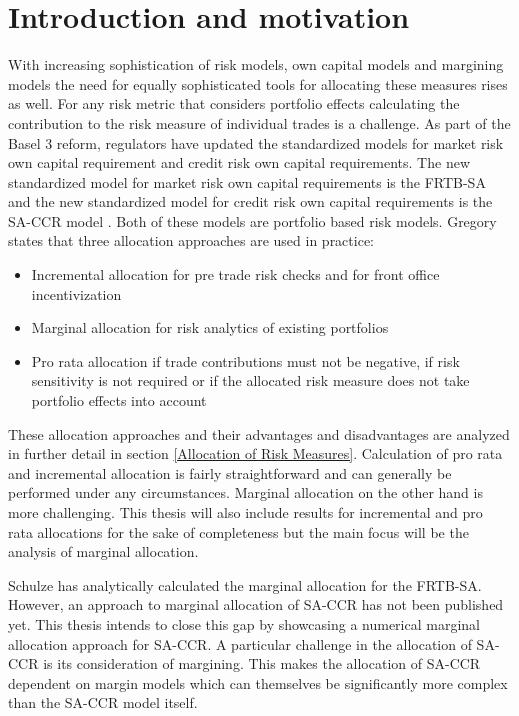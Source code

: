 \documentclass[../Thesis_AHoecherl.tex]{subfiles}
\begin{document}
    \section{Introduction and motivation}

    With increasing sophistication of risk models, own capital models and margining models the need for equally sophisticated tools for allocating these measures rises as well. For any risk metric that considers portfolio effects calculating the contribution to the risk measure of individual trades is a challenge. As part of the Basel 3 reform,  regulators have updated the standardized models for market risk own capital requirement and credit risk own capital requirements. The new standardized model for market risk own capital requirements is the FRTB-SA  and the new standardized model for credit risk own capital requirements is the SA-CCR model . Both of these models are portfolio based risk models. Gregory \cite[Chapter~10.7]{gregory2015xva} states that three allocation approaches are used in practice:

    \begin{itemize}
        \item Incremental allocation for pre trade risk checks and for front office incentivization  
        \item Marginal allocation for risk analytics of existing portfolios 
        \item Pro rata allocation if trade contributions must not be negative, if risk sensitivity is not required or if the allocated risk measure does not take portfolio effects into account
    \end{itemize}

    These allocation approaches and their advantages and disadvantages are analyzed in further detail in section \ref{Allocation of Risk Measures}. Calculation of pro rata and incremental allocation is fairly straightforward and can generally be performed under any circumstances. Marginal allocation on the other hand is more challenging. This thesis will also include results for incremental and pro rata allocations for the sake of completeness but the main focus will be the analysis of marginal allocation.

    Schulze \cite{schulze2018capital} has analytically calculated the marginal allocation for the FRTB-SA. However, an approach to marginal allocation of SA-CCR has not been published yet. This thesis intends to close this gap by showcasing a numerical marginal allocation approach for SA-CCR. A particular challenge in the allocation of SA-CCR is its consideration of margining. This makes the allocation of SA-CCR dependent on margin models which can themselves be significantly more complex than the SA-CCR model itself.
\end{document}
